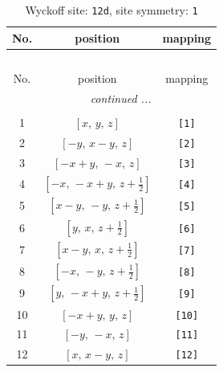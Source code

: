\documentclass[fleqn,8pt]{jsarticle}
\begin{document}
\begin{longtable}{ccc}
\caption{Wyckoff site: {\tt 12d}, site symmetry: {\tt 1}}
 \\
 \hline \hline
No. & position & mapping \\ \hline \endfirsthead

\multicolumn{2}{l}{\tablename\ \thetable{}} \\
 \hline \hline
No. & position & mapping \\ \hline \endhead

 \hline \hline
\multicolumn{2}{r}{\footnotesize\it continued ...} \\ \endfoot

 \hline \hline
\multicolumn{2}{r}{} \\ \endlastfoot

1 & $\left[ x,\, y,\, z \right]$ & {\tt [1]} \\ \hline
2 & $\left[ - y,\, x - y,\, z \right]$ & {\tt [2]} \\ \hline
3 & $\left[ - x + y,\, - x,\, z \right]$ & {\tt [3]} \\ \hline
4 & $\left[ - x,\, - x + y,\, z + \frac{1}{2} \right]$ & {\tt [4]} \\ \hline
5 & $\left[ x - y,\, - y,\, z + \frac{1}{2} \right]$ & {\tt [5]} \\ \hline
6 & $\left[ y,\, x,\, z + \frac{1}{2} \right]$ & {\tt [6]} \\ \hline
7 & $\left[ x - y,\, x,\, z + \frac{1}{2} \right]$ & {\tt [7]} \\ \hline
8 & $\left[ - x,\, - y,\, z + \frac{1}{2} \right]$ & {\tt [8]} \\ \hline
9 & $\left[ y,\, - x + y,\, z + \frac{1}{2} \right]$ & {\tt [9]} \\ \hline
10 & $\left[ - x + y,\, y,\, z \right]$ & {\tt [10]} \\ \hline
11 & $\left[ - y,\, - x,\, z \right]$ & {\tt [11]} \\ \hline
12 & $\left[ x,\, x - y,\, z \right]$ & {\tt [12]} \\
\end{longtable}
\end{document}
